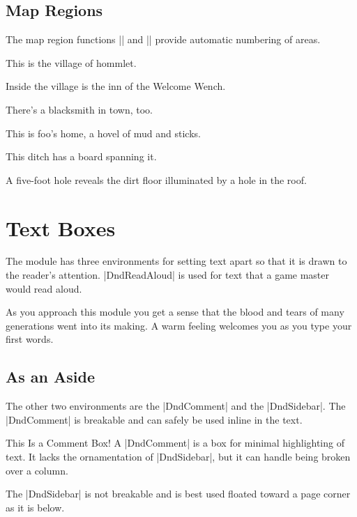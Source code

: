 \documentclass[letterpaper,twocolumn,openany,nodeprecatedcode]{dndbook}
\begin{document}
\section{Map Regions}
The map region functions |\DndArea| and |\DndSubArea| provide automatic numbering of areas.

This is the village of hommlet.

Inside the village is the inn of the Welcome Wench.

There's a blacksmith in town, too.

This is foo's home, a hovel of mud and sticks.

This ditch has a board spanning it.

A five-foot hole reveals the dirt floor illuminated by a hole in the roof.

\chapter{Text Boxes}

The module has three environments for setting text apart so that it is drawn to the reader's attention. |DndReadAloud| is used for text that a game master would read aloud.

\begin{DndReadAloud}
  As you approach this module you get a sense that the blood and tears of many generations went into its making. A warm feeling welcomes you as you type your first words.
\end{DndReadAloud}

\section{As an Aside}
The other two environments are the |DndComment| and the |DndSidebar|. The |DndComment| is breakable and can safely be used inline in the text.

\begin{DndComment}{This Is a Comment Box!}
  A |DndComment| is a box for minimal highlighting of text. It lacks the ornamentation of |DndSidebar|, but it can handle being broken over a column.
\end{DndComment}

The |DndSidebar| is not breakable and is best used floated toward a page corner as it is below.
\end{document}
